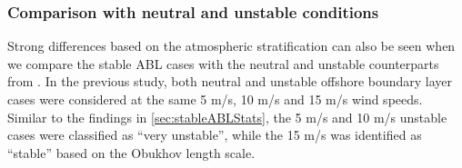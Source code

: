 



\subsubsection{Comparison with neutral and unstable conditions}

Strong differences based on the atmospheric stratification can also be
seen when we compare the stable ABL cases with the neutral and
unstable counterparts from \cite{cheung2020large}.  In the previous
study, both neutral and unstable offshore boundary layer cases were
considered at the same 5 m/s, 10 m/s and 15 m/s wind speeds.  Similar
to the findings in \ref{sec:stableABLStats}, the 5 m/s and 10 m/s
unstable cases were classified as ``very unstable'', while the 15 m/s
was identified as ``stable'' based on the Obukhov length scale.

